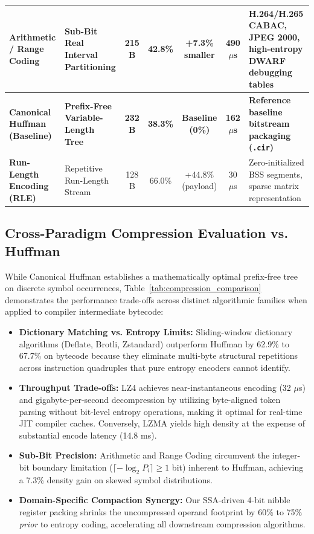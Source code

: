 \documentclass{ieeeaccess}
\begin{document}
\begin{table}[t]
\begin{tabularx}{\textwidth}{l l c c c c X}
\textbf{Arithmetic / Range Coding} & Sub-Bit Real Interval Partitioning & 215 B & 42.8\% & \textbf{+7.3\% smaller} & 490 $\mu$s & H.264/H.265 CABAC, JPEG 2000, high-entropy DWARF debugging tables \\
\midrule
\textbf{Canonical Huffman (Baseline)} & \textbf{Prefix-Free Variable-Length Tree} & \textbf{232 B} & \textbf{38.3\%} & \textbf{Baseline (0\%)} & \textbf{162 $\mu$s} & \textbf{Reference baseline bitstream packaging (\texttt{.cir})} \\
\midrule
\textbf{Run-Length Encoding (RLE)} & Repetitive Run-Length Stream & 128 B & 66.0\% & +44.8\% (payload) & 30 $\mu$s & Zero-initialized BSS segments, sparse matrix representation \\
\bottomrule
\end{tabularx}
\end{table}

\subsection{Cross-Paradigm Compression Evaluation vs. Huffman}
While Canonical Huffman establishes a mathematically optimal prefix-free tree on discrete symbol occurrences, Table~\ref{tab:compression_comparison} demonstrates the performance trade-offs across distinct algorithmic families when applied to compiler intermediate bytecode:
\begin{itemize}
    \item \textbf{Dictionary Matching vs. Entropy Limits:} Sliding-window dictionary algorithms (Deflate, Brotli, Zstandard) outperform Huffman by 62.9\% to 67.7\% on bytecode because they eliminate multi-byte structural repetitions across instruction quadruples that pure entropy encoders cannot identify.
    \item \textbf{Throughput Trade-offs:} LZ4 achieves near-instantaneous encoding (32 $\mu$s) and gigabyte-per-second decompression by utilizing byte-aligned token parsing without bit-level entropy operations, making it optimal for real-time JIT compiler caches. Conversely, LZMA yields high density at the expense of substantial encode latency (14.8 ms).
    \item \textbf{Sub-Bit Precision:} Arithmetic and Range Coding circumvent the integer-bit boundary limitation ($\lceil -\log_2 P_i \rceil \ge 1$ bit) inherent to Huffman, achieving a 7.3\% density gain on skewed symbol distributions.
    \item \textbf{Domain-Specific Compaction Synergy:} Our SSA-driven 4-bit nibble register packing shrinks the uncompressed operand footprint by 60\% to 75\% \textit{prior} to entropy coding, accelerating all downstream compression algorithms.
\end{itemize}
\end{document}
